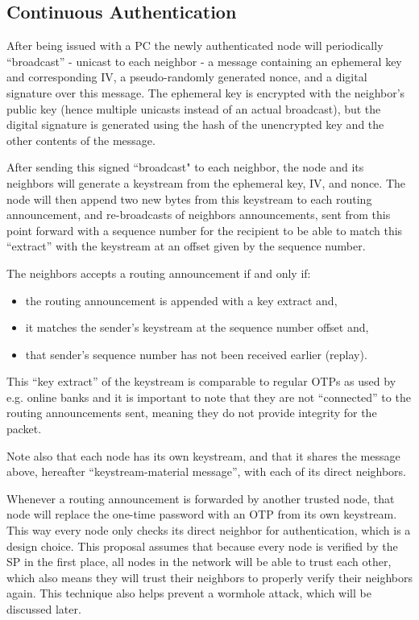 \subsection{Continuous Authentication}
After being issued with a \ac{PC} the newly authenticated node will periodically
``broadcast'' - unicast to each neighbor - a message containing an ephemeral key
and corresponding \ac{IV}, a pseudo-randomly generated nonce, and a digital
signature over this message. The ephemeral key is encrypted with the neighbor's
public key (hence multiple unicasts instead of an actual broadcast), but the
digital signature is generated using the hash of the unencrypted key and the
other contents of the message.

After sending this signed ``broadcast" to each neighbor, the node and its
neighbors will generate a keystream from the ephemeral key, \ac{IV}, and nonce.
The node will then append two new bytes from this keystream to each routing
announcement, and re-broadcasts of neighbors announcements, sent from this point
forward with a sequence number for the recipient to be able to match this
``extract'' with the keystream at an offset given by the sequence number.

The neighbors accepts a routing announcement if and only if:

\begin{itemize}
  \item the routing announcement is appended with a key extract and,
  \item it matches the sender's keystream at the sequence number offset and,
  \item that sender's sequence number has not been received earlier (replay).
\end{itemize}

This ``key extract'' of the keystream is comparable to regular \acp{OTP} as used
by e.g. online banks and it is important to note that they are not ``connected''
to the routing announcements sent, meaning they do not provide integrity for the
packet.

Note also that each node has its own keystream, and that it shares the message
above, hereafter ``keystream-material message'', with each of its direct
neighbors.

Whenever a routing announcement is forwarded by another trusted node, that
node will replace the one-time password with an \ac{OTP} from its own keystream.
This way every node only checks its direct neighbor for authentication, which is
a design choice. This proposal assumes that because every node is verified by
the \ac{SP} in the first place, all nodes in the network will be able to trust
each other, which also means they will trust their neighbors to properly verify
their neighbors again. This technique also helps prevent a wormhole attack,
which will be discussed later.

